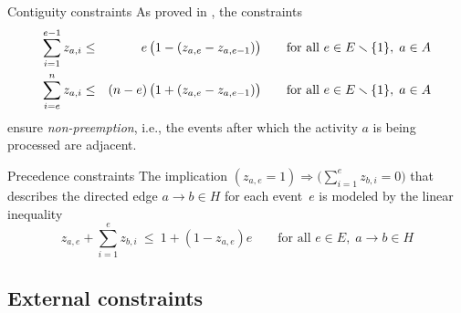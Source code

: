 \documentclass[11pt,reqno]{amsart}
\newcommand{\lra}{\longrightarrow}
\numberwithin{equation}{section}
\begin{document}
\begin{mydesc}
\item[Contiguity constraints] As proved in \cite[Proposition 1]{artigues-etal11a}, the
  constraints
  \begin{eqnarray}
    \sum_{i=1}^{e-1} z_{a,i}
    &\le&
    \phantom{(n-e)}\llap{$e$}\,\big(1-(z_{a,e} - z_{a,e-1})\big)
    \qquad\text{for all } e\in E\smallsetminus\{1\},\; a\in A
    \\
    \sum_{i=e}^n z_{a,i}
    &\le&
    (n-e)\,\big(1+(z_{a,e} - z_{a,e-1})\big)
    \qquad\text{for all } e\in E\smallsetminus\{1\},\; a\in A
  \end{eqnarray}
  ensure \emph{non-preemption}, i.e., the events after which the activity $a$ is being
  processed are adjacent.

\item[Precedence constraints] The implication $(z_{a,e}=1) \Longrightarrow
  \big(\sum_{i=1}^{e} z_{b,i}=0\big)$ that describes the directed edge $a\lra b\in H$ for
  each event~$e$ is modeled by the linear inequality
  \begin{equation}
     z_{a,e} + \sum_{i=1}^e z_{b,i}
     \ \le \
     1+(1-z_{a,e})e
     \qquad\text{for all } e\in E,\; a\lra b\in H
  \end{equation}

\end{mydesc}

\subsection{External constraints}
\end{document}
